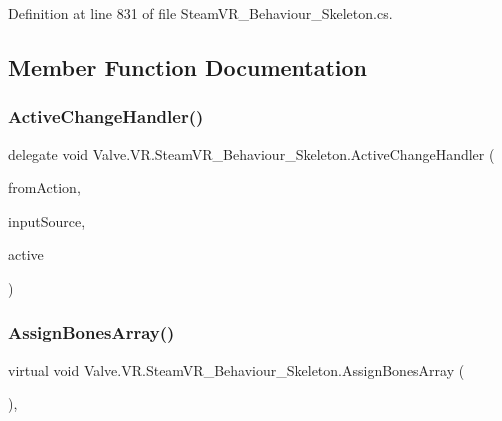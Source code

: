Definition at line 831 of file Steam\+V\+R\+\_\+\+Behaviour\+\_\+\+Skeleton.\+cs.



\subsection{Member Function Documentation}
\mbox{\label{class_valve_1_1_v_r_1_1_steam_v_r___behaviour___skeleton_a57f0a6388d13f0c3ac6fd1bd4aba05c9}} 
\subsubsection{\texorpdfstring{ActiveChangeHandler()}{ActiveChangeHandler()}}
{\footnotesize\ttfamily delegate void Valve.\+V\+R.\+Steam\+V\+R\+\_\+\+Behaviour\+\_\+\+Skeleton.\+Active\+Change\+Handler (\begin{DoxyParamCaption}\item[{\mbox{\hyperlink{class_valve_1_1_v_r_1_1_steam_v_r___behaviour___skeleton}{Steam\+V\+R\+\_\+\+Behaviour\+\_\+\+Skeleton}}}]{from\+Action,  }\item[{\mbox{\hyperlink{namespace_valve_1_1_v_r_a82e5bf501cc3aa155444ee3f0662853f}{Steam\+V\+R\+\_\+\+Input\+\_\+\+Sources}}}]{input\+Source,  }\item[{bool}]{active }\end{DoxyParamCaption})}

\mbox{\label{class_valve_1_1_v_r_1_1_steam_v_r___behaviour___skeleton_a1d94d724c0240744213baf0b550af9c0}} 
\subsubsection{\texorpdfstring{AssignBonesArray()}{AssignBonesArray()}}
{\footnotesize\ttfamily virtual void Valve.\+V\+R.\+Steam\+V\+R\+\_\+\+Behaviour\+\_\+\+Skeleton.\+Assign\+Bones\+Array (\begin{DoxyParamCaption}{ }\end{DoxyParamCaption})\hspace{0.3cm}{\ttfamily [protected]}, {\ttfamily [virtual]}}



